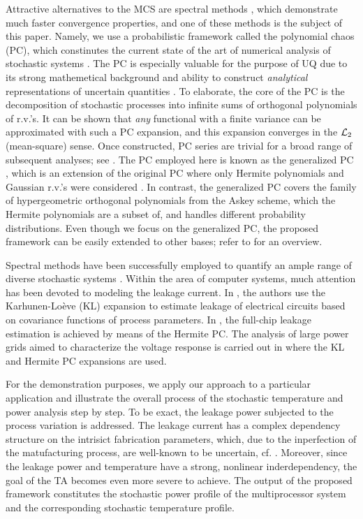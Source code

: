 Attractive alternatives to the MCS are spectral methods \cite{maitre2010}, which demonstrate much faster convergence properties, and one of these methods is the subject of this paper. Namely, we use a probabilistic framework called the polynomial chaos (PC), which constinutes the current state of the art of numerical analysis of stochastic systems \cite{xiu2009}. The PC is especially valuable for the purpose of UQ due to its strong mathemetical background and ability to construct \emph{analytical} representations of uncertain quantities \cite{eldred2009}. To elaborate, the core of the PC is the decomposition of stochastic processes into infinite sums of orthogonal polynomials of r.v.'s. It can be shown that \emph{any} functional with a finite variance can be approximated with such a PC expansion, and this expansion converges in the $\mathcal{L}_{2}$ (mean-square) sense. Once constructed, PC series are trivial for a broad range of subsequent analyses; see \cite{eldred2009, maitre2010}. The PC employed here is known as the generalized PC \cite{xiu2002}, which is an extension of the original PC where only Hermite polynomials and Gaussian r.v.'s were considered \cite{ghanem1991}. In contrast, the generalized PC covers the family of hypergeometric orthogonal polynomials from the Askey scheme, which the Hermite polynomials are a subset of, and handles different probability distributions. Even though we focus on the generalized PC, the proposed framework can be easily extended to other bases; refer to \cite{maitre2010} for an overview.

Spectral methods have been successfully employed to quantify an ample range of diverse stochastic systems \cite{xiu2010}. Within the area of computer systems, much attention has been devoted to modeling the leakage current. In \cite{bhardwaj2006}, the authors use the Karhunen-Lo\`{e}ve (KL) expansion \cite{loeve1978} to estimate leakage of electrical circuits based on covariance functions of process parameters. In \cite{shen2009}, the full-chip leakage estimation is achieved by means of the Hermite PC. The analysis of large power grids aimed to characterize the voltage response is carried out in \cite{ghanta2006} where the KL and Hermite PC expansions are used.

For the demonstration purposes, we apply our approach to a particular application and illustrate the overall process of the stochastic temperature and power analysis step by step. To be exact, the leakage power subjected to the process variation is addressed. The leakage current has a complex dependency structure on the intrisict fabrication parameters, which, due to the inperfection of the matufacturing process, are well-known to be uncertain, cf. \cite{juan2012, srivastava2010}. Moreover, since the leakage power and temperature have a strong, nonlinear inderdependency, the goal of the TA becomes even more severe to achieve. The output of the proposed framework constitutes the stochastic power profile of the multiprocessor system and the corresponding stochastic temperature profile.

